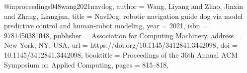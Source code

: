 @inproceedings{048wang2021navdog,
author = {Wang, Liyang and Zhao, Jinxin and Zhang, Liangjun},
title = {NavDog: robotic navigation guide dog via model predictive control and human-robot modeling},
year = {2021},
isbn = {9781450381048},
publisher = {Association for Computing Machinery},
address = {New York, NY, USA},
url = {https://doi.org/10.1145/3412841.3442098},
doi = {10.1145/3412841.3442098},
booktitle = {Proceedings of the 36th Annual ACM Symposium on Applied Computing},
pages = {815–818},
}